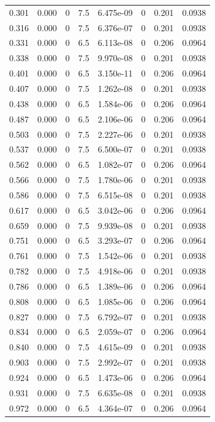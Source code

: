 \documentclass[preview]{standalone}
\begin{document}
{{\begin{tabular}{L{1.2cm}C{1.2cm} C{0.3cm}C{0.5cm} C{1.4cm}C{1.4cm} C{1.4cm}C{1.4cm}}
  0.301  &  0.000  & 0     & 7.5 &  6.475e-09  & 0  & 0.201 &  0.0938   \\ 
  0.316  &  0.000  & 0     & 7.5 &  6.376e-07  & 0  & 0.201 &  0.0938   \\ 
  0.331  &  0.000  & 0     & 6.5 &  6.113e-08  & 0  & 0.206 &  0.0964   \\ 
  0.338  &  0.000  & 0     & 7.5 &  9.970e-08  & 0  & 0.201 &  0.0938   \\ 
  0.401  &  0.000  & 0     & 6.5 &  3.150e-11  & 0  & 0.206 &  0.0964   \\ 
  0.407  &  0.000  & 0     & 7.5 &  1.262e-08  & 0  & 0.201 &  0.0938   \\ 
  0.438  &  0.000  & 0     & 6.5 &  1.584e-06  & 0  & 0.206 &  0.0964   \\ 
  0.487  &  0.000  & 0     & 6.5 &  2.106e-06  & 0  & 0.206 &  0.0964   \\ 
  0.503  &  0.000  & 0     & 7.5 &  2.227e-06  & 0  & 0.201 &  0.0938   \\ 
  0.537  &  0.000  & 0     & 7.5 &  6.500e-07  & 0  & 0.201 &  0.0938   \\ 
  0.562  &  0.000  & 0     & 6.5 &  1.082e-07  & 0  & 0.206 &  0.0964   \\ 
  0.566  &  0.000  & 0     & 7.5 &  1.780e-06  & 0  & 0.201 &  0.0938   \\ 
  0.586  &  0.000  & 0     & 7.5 &  6.515e-08  & 0  & 0.201 &  0.0938   \\ 
  0.617  &  0.000  & 0     & 6.5 &  3.042e-06  & 0  & 0.206 &  0.0964   \\ 
  0.659  &  0.000  & 0     & 7.5 &  9.939e-08  & 0  & 0.201 &  0.0938   \\ 
  0.751  &  0.000  & 0     & 6.5 &  3.293e-07  & 0  & 0.206 &  0.0964   \\ 
  0.761  &  0.000  & 0     & 7.5 &  1.542e-06  & 0  & 0.201 &  0.0938   \\ 
  0.782  &  0.000  & 0     & 7.5 &  4.918e-06  & 0  & 0.201 &  0.0938   \\ 
  0.786  &  0.000  & 0     & 6.5 &  1.389e-06  & 0  & 0.206 &  0.0964   \\ 
  0.808  &  0.000  & 0     & 6.5 &  1.085e-06  & 0  & 0.206 &  0.0964   \\ 
  0.827  &  0.000  & 0     & 7.5 &  6.792e-07  & 0  & 0.201 &  0.0938   \\ 
  0.834  &  0.000  & 0     & 6.5 &  2.059e-07  & 0  & 0.206 &  0.0964   \\ 
  0.840  &  0.000  & 0     & 7.5 &  4.615e-09  & 0  & 0.201 &  0.0938   \\ 
  0.903  &  0.000  & 0     & 7.5 &  2.992e-07  & 0  & 0.201 &  0.0938   \\ 
  0.924  &  0.000  & 0     & 6.5 &  1.473e-06  & 0  & 0.206 &  0.0964   \\ 
  0.931  &  0.000  & 0     & 7.5 &  6.635e-08  & 0  & 0.201 &  0.0938   \\ 
  0.972  &  0.000  & 0     & 6.5 &  4.364e-07  & 0  & 0.206 &  0.0964   \\ 
\hline 
\end{tabular} 

}}
\end{document}
